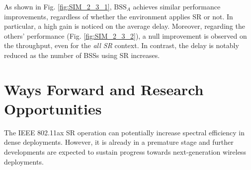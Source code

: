 \documentclass{article}
\begin{document}
As shown in Fig. \ref{fig:SIM_2_3_1}, $\text{BSS}_A$ achieves similar performance improvements, regardless of whether the environment applies SR or not. In particular, a high gain is noticed on the average delay. Moreover, regarding the others' performance (Fig. \ref{fig:SIM_2_3_2}), a null improvement is observed on the throughput, even for the \emph{all SR} context. In contrast, the delay is notably reduced as the number of BSSs using SR increases.

\section{Ways Forward and Research Opportunities}
\label{section:ways_forwad}
The IEEE 802.11ax SR operation can potentially increase spectral efficiency in dense deployments. However, it is already in a premature stage and further developments are expected to sustain progress towards next-generation wireless deployments. 
\end{document}
